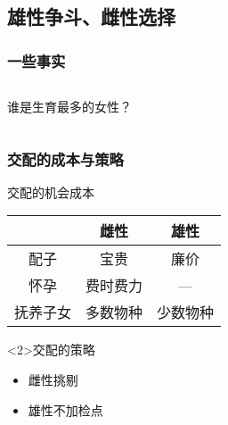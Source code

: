 \documentclass[UTF8,lualatex]{ctexbeamer}
\begin{document}
\subsection{雄性争斗、雌性选择}

\begin{frame}
    \frametitle{一些事实}
    \begin{columns}
        \begin{column}{.48\textwidth}
            \begin{block}{谁是生育最多的女性？}
            \end{block}
        \end{column}
        \begin{column}{.48\textwidth}
        \end{column}
    \end{columns}
\end{frame}

\begin{frame}
    \frametitle{交配的成本与策略}
    \begin{block}{交配的机会成本}
        \begin{center}
            \begin{tabular}{*{3}{c}}
                \\ \hline
                        & 雌性  & 雄性 \\
                \hline
                配子    & 宝贵  & 廉价 \\
                怀孕    & 费时费力 & — \\
                抚养子女& 多数物种 & 少数物种 \\
                \hline
            \end{tabular}
        \end{center}
    \end{block}
    \begin{block}<2>{交配的策略}
        \begin{itemize}
            \item 雌性挑剔
            \item 雄性不加检点
        \end{itemize}
    \end{block}
\end{frame}
\end{document}
